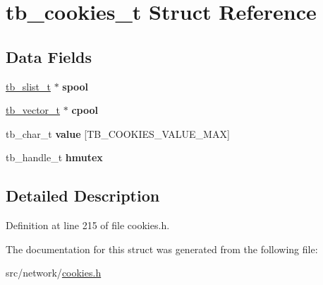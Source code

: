 \hypertarget{structtb__cookies__t}{\section{tb\-\_\-cookies\-\_\-t Struct Reference}
\label{structtb__cookies__t}
}
\subsection*{Data Fields}
\begin{DoxyCompactItemize}
\item 
\hypertarget{structtb__cookies__t_a4774d73033fc51900d8db1bcf9cf136a}{\hyperlink{slist_8h_a3b0037e6cdcd748de9b5f5dc9fc439cf}{tb\-\_\-slist\-\_\-t} $\ast$ {\bfseries spool}}\label{structtb__cookies__t_a4774d73033fc51900d8db1bcf9cf136a}

\item 
\hypertarget{structtb__cookies__t_a37db2b7c2d07d55a481693aa21bc34fb}{\hyperlink{vector_8h_ab1343bc2d278af4a9612b79bf4d882cd}{tb\-\_\-vector\-\_\-t} $\ast$ {\bfseries cpool}}\label{structtb__cookies__t_a37db2b7c2d07d55a481693aa21bc34fb}

\item 
\hypertarget{structtb__cookies__t_a06a565c556e23532ff54a142f0c38b69}{tb\-\_\-char\-\_\-t {\bfseries value} \mbox{[}T\-B\-\_\-\-C\-O\-O\-K\-I\-E\-S\-\_\-\-V\-A\-L\-U\-E\-\_\-\-M\-A\-X\mbox{]}}\label{structtb__cookies__t_a06a565c556e23532ff54a142f0c38b69}

\item 
\hypertarget{structtb__cookies__t_a84ba13571bb1bfb4f03be731ef0e7aae}{tb\-\_\-handle\-\_\-t {\bfseries hmutex}}\label{structtb__cookies__t_a84ba13571bb1bfb4f03be731ef0e7aae}

\end{DoxyCompactItemize}


\subsection{Detailed Description}


Definition at line 215 of file cookies.\-h.



The documentation for this struct was generated from the following file\-:\begin{DoxyCompactItemize}
\item 
src/network/\hyperlink{cookies_8h}{cookies.\-h}\end{DoxyCompactItemize}
